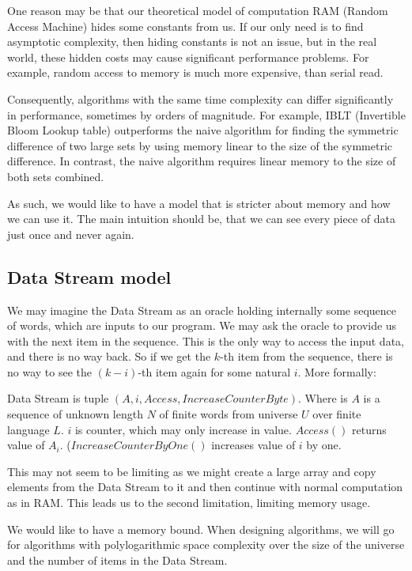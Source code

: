 One reason may be that our theoretical model of computation RAM (Random Access Machine) hides some constants from us. 
If our only need is to find asymptotic complexity, then hiding constants is not an issue, but in the real world, these hidden costs may cause significant performance problems. For example, random access to memory is much more expensive, than serial read.

Consequently, algorithms with the same time complexity can differ significantly in performance, sometimes by orders of magnitude. For example, IBLT (Invertible Bloom Lookup table) outperforms the naive algorithm for finding the symmetric difference of two large sets by using memory linear to the size of the symmetric difference. In contrast, the naive algorithm requires linear memory to the size of both sets combined.

As such, we would like to have a model that is stricter about memory and how we can use it. The main intuition should be, that we can see every piece of data just once and never again.

\subsection{Data Stream model}

We may imagine the Data Stream as an oracle holding internally some sequence of words, which are inputs to our program. We may ask the oracle to provide us with the next item in the sequence. This is the only way to access the input data, and there is no way back. So if we get the \(k\)-th item from the sequence, there is no way to see the \((k-i)\)-th item again for some natural \(i\). More formally:

\begin{defn}
Data Stream is tuple $(A, i, Access, IncreaseCounterByte)$. Where is $A$ is a sequence of unknown length \(N\) of finite words from universe $U$ over finite language $L$. $i$ is counter, which may only increase in value. $Access()$ returns value of $A_i$. (\(IncreaseCounterByOne()\) increases value of $i$ by one.
\end{defn}

This may not seem to be limiting as we might create a large array and copy elements from the Data Stream to it and then continue with normal computation as in RAM. This leads us to the second limitation, limiting memory usage.

We would like to have a memory bound. When designing algorithms, we will go for algorithms with polylogarithmic space complexity over the size of the universe and the number of items in the Data Stream.

